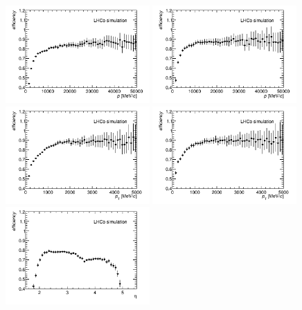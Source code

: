 \begin{figure}[tbph]
\begin{center}
\includegraphics[width = 0.49\textwidth]{figures/EffPatLLT/overall/BJpsiKSP.png}
\includegraphics[width = 0.49\textwidth]{figures/EffPatLLT/overall/BJpsiKSFromBDP.png}
\includegraphics[width = 0.49\textwidth]{figures/EffPatLLT/overall/BJpsiKSPt.png}
\includegraphics[width = 0.49\textwidth]{figures/EffPatLLT/overall/BJpsiKSFromBDPt.png}
\includegraphics[width = 0.49\textwidth]{figures/EffPatLLT/overall/BJpsiKSEta.png}

\end{center}
\end{figure}
